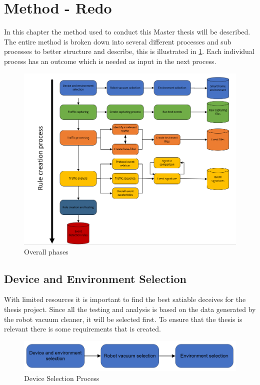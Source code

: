 \chapter*{Method - Redo}

In this chapter the method used to conduct this Master thesis will be described. The entire method is broken down into several different processes and sub processes to better structure and describe, this is illustrated in \ref{fig:Method_process}. Each individual process has an outcome which is needed as input in the next process. 

\begin{figure}[H]
    \centering
    \includegraphics[width=\textwidth]{figures/Method_process.png}
    \caption{Overall phases }
    \label{fig:Method_process}
\end{figure}


\section{Device and Environment Selection}
With limited resources it is important to find the best satiable deceives for the thesis project. Since all the testing and analysis is based on the data generated by the robot vacuum cleaner, it will be selected first. To ensure that the thesis is relevant there is some requirements that is created.

\begin{figure}[H]
    \centering
    \includegraphics[width=\textwidth]{figures/DeviceSelectionProcess.png}
    \caption{Device Selection Process}
    \label{fig:DeviceSelectionProcess}
\end{figure}

